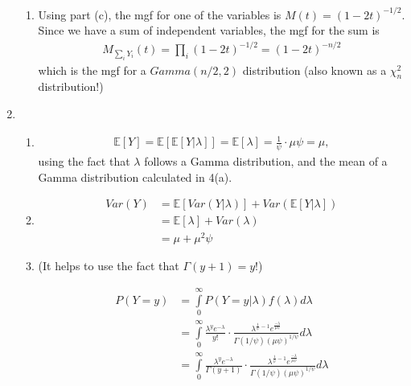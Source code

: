 \documentclass[12pt]{article}
\begin{document}
\begin{enumerate}
\begin{enumerate}
\item Using part (c), the mgf for one of the variables is $M(t) = \left(1 - 2t \right)^{-1/2}$. Since we have a sum of independent variables, the mgf for the sum is
\begin{align*}
M_{\sum_i Y_i}(t) = \prod \limits_i \left(1 - 2t \right)^{-1/2} = \left(1 - 2t \right)^{-n/2}
\end{align*}
which is the mgf for a $Gamma(n/2, 2)$ distribution (also known as a $\chi^2_n$ distribution!)

\end{enumerate}

\item 

\begin{enumerate}
\item 

\begin{align*}
\mathbb{E}[Y] = \mathbb{E}[\mathbb{E}[Y|\lambda]] = \mathbb{E}[\lambda] = \frac{1}{\psi} \cdot \mu \psi = \mu,
\end{align*}
using the fact that $\lambda$ follows a Gamma distribution, and the mean of a Gamma distribution calculated in 4(a).

\item

\begin{align*}
Var(Y) &= \mathbb{E}[Var(Y|\lambda)] + Var(\mathbb{E}[Y|\lambda]) \\
&= \mathbb{E}[\lambda] + Var(\lambda) \\
&= \mu + \mu^2 \psi
\end{align*}

\item (It helps to use the fact that $\Gamma(y+1) = y!$)

\begin{align*}
P(Y = y) &= \int \limits_0^\infty P(Y = y | \lambda) f(\lambda) d \lambda \\
&= \int \limits_0^\infty \frac{\lambda^y e^{-\lambda}}{y!} \cdot \frac{\lambda^{\frac{1}{\psi} - 1}e^{\frac{-\lambda}{\mu \psi}}}{\Gamma(1/\psi)(\mu \psi)^{1/\psi}} d \lambda \\
&= \int \limits_0^\infty \frac{\lambda^y e^{-\lambda}}{\Gamma(y+1)} \cdot \frac{\lambda^{\frac{1}{\psi} - 1}e^{\frac{-\lambda}{\mu \psi}}}{\Gamma(1/\psi)(\mu \psi)^{1/\psi}} d \lambda \\
\end{align*}


\end{enumerate}


\end{enumerate}
\end{document}
